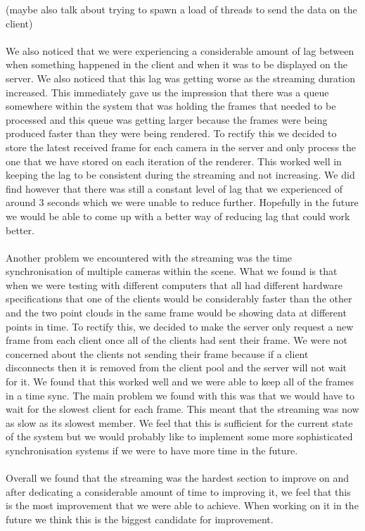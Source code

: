\documentclass{article}
\begin{document}
(maybe also talk about trying to spawn a load of threads to send the data on the client)
\\\\
We also noticed that we were experiencing a considerable amount of lag between when something happened in the client and when it was to be displayed on the server. We also noticed that this lag was getting worse as the streaming duration increased. This immediately gave us the impression that there was a queue somewhere within the system that was holding the frames that needed to be processed and this queue was getting larger because the frames were being produced faster than they were being rendered. To rectify this we decided to store the latest received frame for each camera in the server and only process the one that we have stored on each iteration of the renderer. This worked well in keeping the lag to be consistent during the streaming and not increasing. We did find however that there was still a constant level of lag that we experienced of around 3 seconds which we were unable to reduce further. Hopefully in the future we would be able to come up with a better way of reducing lag that could work better.
\\\\
Another problem we encountered with the streaming was the time synchronisation of multiple cameras within the scene. What we found is that when we were testing with different computers that all had different hardware specifications that one of the clients would be considerably faster than the other and the two point clouds in the same frame would be showing data at different points in time. To rectify this, we decided to make the server only request a new frame from each client once all of the clients had sent their frame. We were not concerned about the clients not sending their frame because if a client disconnects then it is removed from the client pool and the server will not wait for it. We found that this worked well and we were able to keep all of the frames in a time sync. The main problem we found with this was that we would have to wait for the slowest client for each frame. This meant that the streaming was now as slow as its slowest member. We feel that this is sufficient for the current state of the system but we would probably like to implement some more sophisticated synchronisation systems if we were to have more time in the future.
\\\\
Overall we found that the streaming was the hardest section to improve on and after dedicating a considerable amount of time to improving it, we feel that this is the most improvement that we were able to achieve. When working on it in the future we think this is the biggest candidate for improvement.
\newpage
\end{document}
